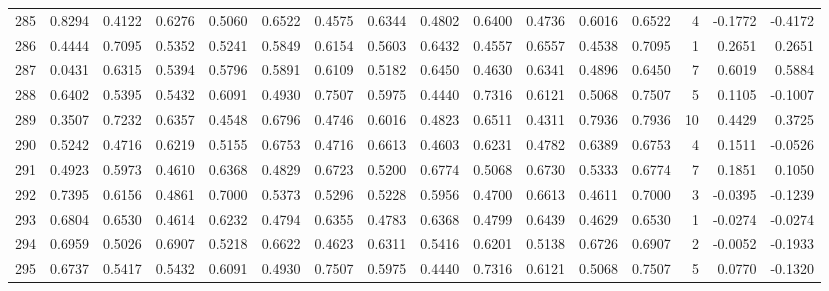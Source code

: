 \begin{tabular}{lrrrrrrrrrrrrrrr}
285 &      0.8294 &  0.4122 &  0.6276 &  0.5060 &  0.6522 &  0.4575 &  0.6344 &  0.4802 &  0.6400 &  0.4736 &   0.6016 &     0.6522 &      4 &                   -0.1772 &                    -0.4172 \\
286 &      0.4444 &  0.7095 &  0.5352 &  0.5241 &  0.5849 &  0.6154 &  0.5603 &  0.6432 &  0.4557 &  0.6557 &   0.4538 &     0.7095 &      1 &                    0.2651 &                     0.2651 \\
287 &      0.0431 &  0.6315 &  0.5394 &  0.5796 &  0.5891 &  0.6109 &  0.5182 &  0.6450 &  0.4630 &  0.6341 &   0.4896 &     0.6450 &      7 &                    0.6019 &                     0.5884 \\
288 &      0.6402 &  0.5395 &  0.5432 &  0.6091 &  0.4930 &  0.7507 &  0.5975 &  0.4440 &  0.7316 &  0.6121 &   0.5068 &     0.7507 &      5 &                    0.1105 &                    -0.1007 \\
289 &      0.3507 &  0.7232 &  0.6357 &  0.4548 &  0.6796 &  0.4746 &  0.6016 &  0.4823 &  0.6511 &  0.4311 &   0.7936 &     0.7936 &     10 &                    0.4429 &                     0.3725 \\
290 &      0.5242 &  0.4716 &  0.6219 &  0.5155 &  0.6753 &  0.4716 &  0.6613 &  0.4603 &  0.6231 &  0.4782 &   0.6389 &     0.6753 &      4 &                    0.1511 &                    -0.0526 \\
291 &      0.4923 &  0.5973 &  0.4610 &  0.6368 &  0.4829 &  0.6723 &  0.5200 &  0.6774 &  0.5068 &  0.6730 &   0.5333 &     0.6774 &      7 &                    0.1851 &                     0.1050 \\
292 &      0.7395 &  0.6156 &  0.4861 &  0.7000 &  0.5373 &  0.5296 &  0.5228 &  0.5956 &  0.4700 &  0.6613 &   0.4611 &     0.7000 &      3 &                   -0.0395 &                    -0.1239 \\
293 &      0.6804 &  0.6530 &  0.4614 &  0.6232 &  0.4794 &  0.6355 &  0.4783 &  0.6368 &  0.4799 &  0.6439 &   0.4629 &     0.6530 &      1 &                   -0.0274 &                    -0.0274 \\
294 &      0.6959 &  0.5026 &  0.6907 &  0.5218 &  0.6622 &  0.4623 &  0.6311 &  0.5416 &  0.6201 &  0.5138 &   0.6726 &     0.6907 &      2 &                   -0.0052 &                    -0.1933 \\
295 &      0.6737 &  0.5417 &  0.5432 &  0.6091 &  0.4930 &  0.7507 &  0.5975 &  0.4440 &  0.7316 &  0.6121 &   0.5068 &     0.7507 &      5 &                    0.0770 &                    -0.1320 \\

\end{tabular}
